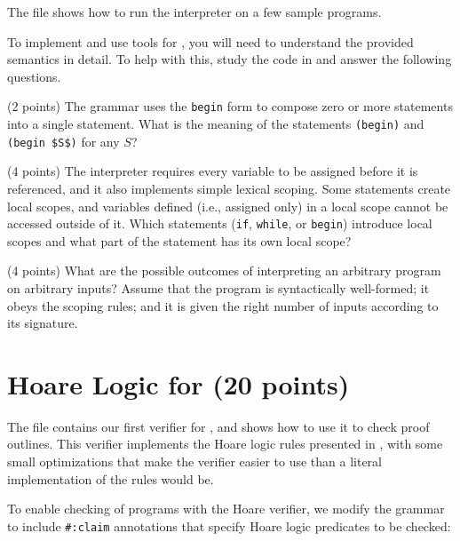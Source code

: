 \documentclass{handout}
\begin{document}
The file  shows how to run the \imp interpreter on a few
sample programs.

To implement and use tools for \imp, you will need to understand the provided
semantics in detail. To help with this, study the code in 
and answer the following questions.

\begin{questions}
  \item (2 points) \label{prob:imp-first} The \imp grammar uses the
  \lstinline{begin} form to compose zero or more \imp statements into a single
  statement. What is the meaning of the statements \lstinline{(begin)} and
  \lstinline{(begin $S$)} for any $S$?

  

  \item (4 points) The \imp interpreter requires every variable to be assigned
  before it is referenced, and it also implements simple lexical scoping. Some
  \imp statements create local scopes, and variables defined (i.e., assigned
  only) in a local scope cannot be accessed outside of it. Which \imp statements
  (\lstinline{if}, \lstinline{while}, or \lstinline{begin}) introduce local
  scopes and what part of the statement has its own local scope?

  

  \item (4 points) \label{prob:imp-last}  What are the possible outcomes of
  interpreting an arbitrary \imp program on arbitrary inputs? Assume that the
  program is syntactically well-formed; it obeys the \imp scoping rules; and it
  is given the right number of inputs according to its signature.

  
\end{questions}

\section{Hoare Logic for \imp (20 points)}\label{sec:imp:hoare}

The file  contains our first verifier for \imp, and
 shows how to use it to check proof outlines. This
verifier implements the Hoare logic rules presented in , with some
small optimizations that make the verifier easier to use than a literal
implementation of the rules would be.

To enable checking of \imp programs with the Hoare verifier, we modify the \imp
grammar to include \lstinline{#:claim} annotations that specify Hoare logic
predicates to be checked:
\end{document}

